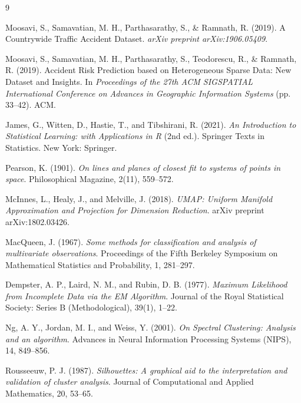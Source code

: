 \documentclass[conference]{IEEEtran}
\begin{document}
\begin{thebibliography}{9}
	
	
Moosavi, S., Samavatian, M. H., Parthasarathy, S., \& Ramnath, R. (2019). 
\newblock A Countrywide Traffic Accident Dataset. 
\newblock \textit{arXiv preprint arXiv:1906.05409}.

Moosavi, S., Samavatian, M. H., Parthasarathy, S., Teodorescu, R., \& Ramnath, R. (2019). 
\newblock Accident Risk Prediction based on Heterogeneous Sparse Data: New Dataset and Insights. 
\newblock In \textit{Proceedings of the 27th ACM SIGSPATIAL International Conference on Advances in Geographic Information Systems} (pp. 33--42). ACM.


James, G., Witten, D., Hastie, T., and Tibshirani, R. (2021). 
\textit{An Introduction to Statistical Learning: with Applications in R} (2nd ed.). 
Springer Texts in Statistics. New York: Springer.

Pearson, K. (1901). 
\textit{On lines and planes of closest fit to systems of points in space}. 
Philosophical Magazine, 2(11), 559–572.

McInnes, L., Healy, J., and Melville, J. (2018). 
\textit{UMAP: Uniform Manifold Approximation and Projection for Dimension Reduction}. 
arXiv preprint arXiv:1802.03426.

MacQueen, J. (1967). 
\textit{Some methods for classification and analysis of multivariate observations}. 
Proceedings of the Fifth Berkeley Symposium on Mathematical Statistics and Probability, 1, 281–297.

Dempster, A. P., Laird, N. M., and Rubin, D. B. (1977). 
\textit{Maximum Likelihood from Incomplete Data via the EM Algorithm}. 
Journal of the Royal Statistical Society: Series B (Methodological), 39(1), 1–22.

Ng, A. Y., Jordan, M. I., and Weiss, Y. (2001). 
\textit{On Spectral Clustering: Analysis and an algorithm}. 
Advances in Neural Information Processing Systems (NIPS), 14, 849–856.

Rousseeuw, P. J. (1987). 
\textit{Silhouettes: A graphical aid to the interpretation and validation of cluster analysis}. 
Journal of Computational and Applied Mathematics, 20, 53–65.


\end{thebibliography}
\end{document}
